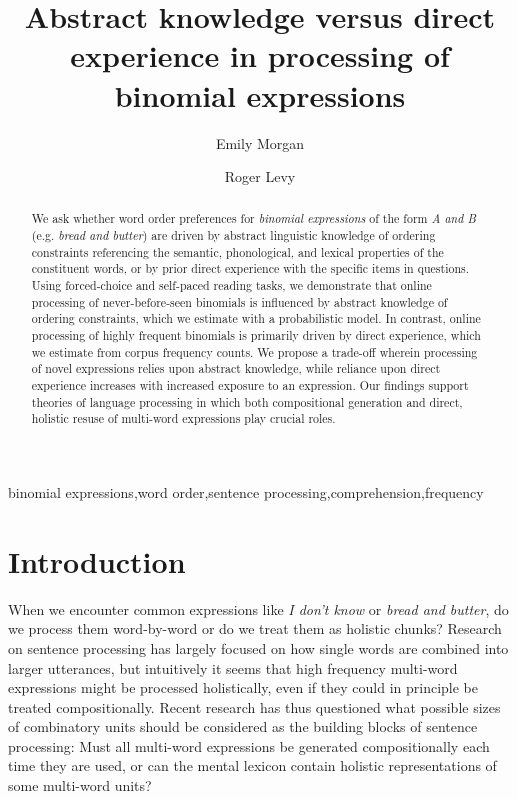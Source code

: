 \documentclass[authoryear]{elsarticle}
\begin{document}


\begin{frontmatter}
\title{Abstract knowledge versus direct experience in processing of binomial expressions}

\author[ucsd]{Emily Morgan}
\author[ucsd]{Roger Levy}

\address[ucsd]{Department of Linguistics, University of California at San Diego, 9500 Gilman Drive, La Jolla, CA 92093-0108, United States}




\begin{abstract}
We ask whether word order preferences for \emph{binomial expressions} of the form \emph{A and B} (e.g. \emph{bread and butter}) are driven by abstract linguistic knowledge of ordering constraints referencing the semantic, phonological, and lexical properties of the constituent words, or by prior direct experience with the specific items in questions. Using forced-choice and self-paced reading tasks, we demonstrate that online processing of never-before-seen binomials is influenced by abstract knowledge of ordering constraints, which we estimate with a probabilistic model. In contrast, online processing of highly frequent binomials is primarily driven by direct experience, which we estimate from corpus frequency counts. We propose a trade-off wherein processing of novel expressions relies upon abstract knowledge, while reliance upon direct experience increases with increased exposure to an expression. Our findings support theories of language processing in which both compositional generation and direct, holistic resuse of multi-word expressions play crucial roles.
\end{abstract}

\begin{keyword} binomial expressions\sep word order\sep sentence processing\sep comprehension\sep frequency \end{keyword}


\end{frontmatter}

\section{Introduction}
When we encounter common expressions like \emph{I don't know} or \emph{bread and butter}, do we process them word-by-word or do we treat them as holistic chunks? Research on sentence processing has largely focused on how single words are combined into larger utterances, but intuitively it seems that high frequency multi-word expressions might be processed holistically, even if they could in principle be treated compositionally. Recent research has thus questioned what possible sizes of combinatory units should be considered as the building blocks of sentence processing: Must all multi-word expressions be generated compositionally each time they are used, or can the mental lexicon contain holistic representations of some multi-word units?
\end{document}
